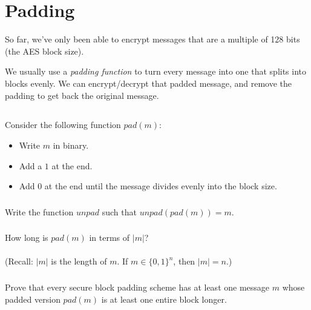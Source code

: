 \documentclass[12pt]{article}
\begin{document}
\newpage
\section{Padding}

\label{padding}

So far, we've only been able to encrypt messages that are a multiple of 128 bits (the AES block size).

We usually use a \emph{padding function} to turn every message into one that splits into blocks evenly. We can encrypt/decrypt that padded message, and remove the padding to get back the original message.

\subsection{}

Consider the following function $pad(m)$:

\begin{itemize}
\item Write $m$ in binary.
\item Add a $1$ at the end.
\item Add $0$ at the end until the message divides evenly into the block size.
\end{itemize}

\subsubsection{}

Write the function $unpad$ such that $unpad(pad(m)) = m$.

\subsubsection{}

How long is $pad(m)$ in terms of $|m|$?\\\\
(Recall: $|m|$ is the length of $m$. If $m\in \{0, 1\}^n$, then $|m| = n$.)

\subsubsection{}

Prove that every secure block padding scheme has at least one message $m$ whose padded version $pad(m)$ is at least one entire block longer.

\subsubsection{}
\end{document}
